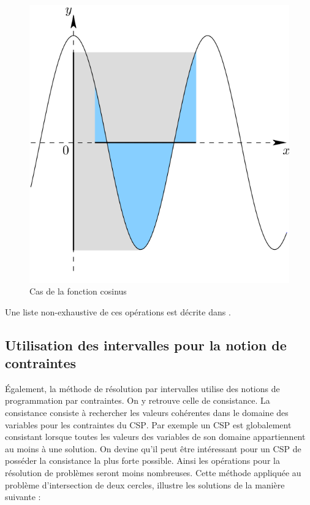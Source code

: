 \begin{figure}[h] %
  \center
\includegraphics[scale=0.30]{img/cos}
  \caption{Cas de la fonction cosinus} %
 \label{fig:Cos} %
\end{figure} %


Une liste non-exhaustive de ces opérations est décrite dans \cite{Goualard}.



\subsection{Utilisation des intervalles pour la notion de contraintes}
Également, la méthode de résolution par intervalles utilise des notions de programmation par contraintes. On y retrouve celle de consistance. La consistance consiste à rechercher les valeurs cohérentes dans le domaine des variables pour les contraintes du \textsc{CSP}. Par exemple un \textsc{CSP} est globalement consistant lorsque toutes les valeurs des variables de son domaine appartiennent au moins à une solution. On devine qu'il peut être intéressant pour un \textsc{CSP} de posséder la consistance la plus forte possible. Ainsi les opérations pour la résolution de problèmes seront moins nombreuses. Cette méthode appliquée au problème d'intersection de deux cercles, illustre les solutions de la manière suivante :


